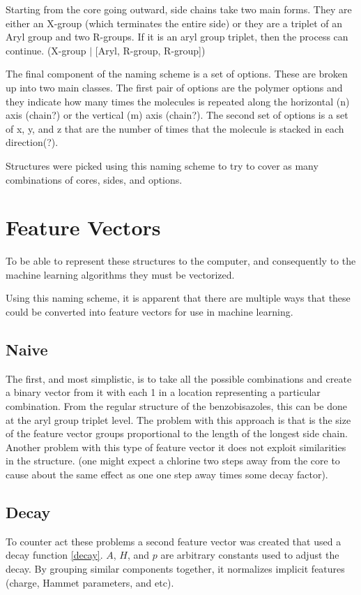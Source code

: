 \documentclass[10pt]{article}
\begin{document}
Starting from the core going outward, side chains take two main forms. They are either an X-group (which terminates the entire side) or they are a triplet of an Aryl group and two R-groups. If it is an aryl group triplet, then the process can continue. (X-group $\vert$ [Aryl, R-group, R-group])

The final component of the naming scheme is a set of options. These are broken up into two main classes. The first pair of options are the polymer options and they indicate how many times the molecules is repeated along the horizontal (n) axis (chain?) or the vertical (m) axis (chain?). The second set of options is a set of x, y, and z that are the number of times that the molecule is stacked in each direction(?).

Structures were picked using this naming scheme to try to cover as many combinations of cores, sides, and options.


\section{Feature Vectors}

To be able to represent these structures to the computer, and consequently to the machine learning algorithms they must be vectorized.

Using this naming scheme, it is apparent that there are multiple ways that these could be converted into feature vectors for use in machine learning.


\subsection{Naive}

The first, and most simplistic, is to take all the possible combinations and create a binary vector from it with each 1 in a location representing a particular combination. From the regular structure of the benzobisazoles, this can be done at the aryl group triplet level.
The problem with this approach is that is the size of the feature vector groups proportional to the length of the longest side chain. Another problem with this type of feature vector it does not exploit similarities in the structure. (one might expect a chlorine two steps away from the core to cause about the same effect as one one step away times some decay factor).


\subsection{Decay}
To counter act these problems a second feature vector was created that used a decay function \eqref{decay}. $A$, $H$, and $p$ are arbitrary constants used to adjust the decay. By grouping similar components together, it normalizes implicit features (charge, Hammet parameters, and etc).
\end{document}
